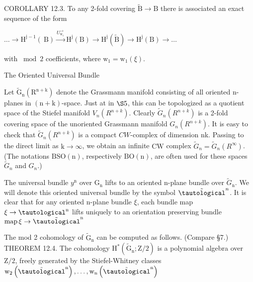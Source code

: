 \documentclass[10pt]{article}
\begin{document}
COROLLARY 12.3. To any 2-fold covering $\widetilde{\mathrm{B}} \rightarrow \mathrm{B}$ there is associated an exact sequence of the form

$\ldots \longrightarrow \mathrm{H}^{\mathrm{j}-1}(\mathrm{~B}) \stackrel{U_{\mathrm{w}_{1}}^{\longrightarrow}}{\longrightarrow} \mathrm{H}^{\mathrm{j}}(\mathrm{B}) \longrightarrow \mathrm{H}^{\mathrm{j}}(\widetilde{\mathrm{B}}) \longrightarrow \mathrm{H}^{\mathrm{j}}(\mathrm{B}) \longrightarrow \ldots$

with $\bmod 2$ coefficients, where $\mathrm{w}_{1}=\mathrm{w}_{1}(\xi)$.

The Oriented Universal Bundle

Let $\widetilde{\mathrm{G}}_{\mathrm{n}}\left(\mathrm{R}^{\mathrm{n}+\mathrm{k}}\right)$ denote the Grassmann manifold consisting of all oriented $\mathrm{n}$-planes in $(\mathrm{n}+\mathrm{k})$-space. Just at in $\S 5$, this can be topologized as a quotient space of the Stiefel manifold $V_{n}\left(R^{n+k}\right)$. Clearly $\widetilde{G}_{n}\left(R^{n+k}\right)$ is a 2-fold covering space of the unoriented Grassmann manifold $G_{n}\left(R^{n+k}\right)$. It is easy to check that $\tilde{G}_{n}\left(R^{n+k}\right)$ is a compact $C W$-complex of dimension nk. Passing to the direct limit as $\mathrm{k} \rightarrow \infty$, we obtain an infinite $\mathrm{CW}$ complex $\tilde{G}_{n}=\tilde{G}_{n}\left(R^{\infty}\right)$. (The notations $\mathrm{BSO}(\mathrm{n})$, respectively $\mathrm{BO}(\mathrm{n})$, are often used for these spaces $\widetilde{G}_{n}$ and $G_{n}$.)

The universal bundle $y^{\mathrm{n}}$ over $\mathrm{G}_{\mathrm{n}}$ lifts to an oriented $\mathrm{n}$-plane bundle over $\widetilde{G}_{\mathrm{n}}$. We will denote this oriented universal bundle by the symbol $\tilde{\tautological}^{n}$. It is clear that for any oriented n-plane bundle $\xi$, each bundle map $\xi \rightarrow \tautological^{\mathrm{n}}$ lifts uniquely to an orientation preserving bundle $\operatorname{map} \xi \rightarrow \tilde{\tautological}^{\mathrm{n}}$

The mod 2 cohomology of $\tilde{\mathrm{G}}_{\mathrm{n}}$ can be computed as follows. (Compare §7.) THEOREM 12.4. The cohomology $\mathrm{H}^{*}\left(\widetilde{\mathrm{G}}_{\mathrm{n}} ; \mathrm{Z} / 2\right)$ is a polynomial algebra over $\mathrm{Z} / 2$, freely generated by the Stiefel-Whitney classes $\mathrm{w}_{2}\left(\tilde{\tautological}^{\mathrm{n}}\right), \ldots, \mathrm{w}_{\mathrm{n}}\left(\tilde{\tautological}^{\mathrm{n}}\right)$
\end{document}
